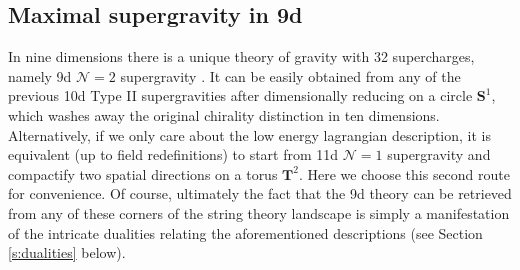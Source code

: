 \subsection{Maximal supergravity in 9d}\label{ss:9dmaxsugra}

In nine dimensions there is a unique theory of gravity with 32 supercharges, namely 9d $\mathcal{N}=2$ supergravity \cite{Gates:1984kr}. It can be easily obtained from any of the previous 10d Type II supergravities after dimensionally reducing on a circle $\mathbf{S}^1$, which washes away the original chirality distinction in ten dimensions. Alternatively, if we only care about the low energy lagrangian description, it is equivalent (up to field redefinitions) to start from 11d $\mathcal{N}=1$ supergravity and compactify two spatial directions on a torus $\mathbf{T}^2$. Here we choose this second route for convenience. Of course, ultimately the fact that the 9d theory can be retrieved from any of these corners of the string theory landscape is simply a manifestation of the intricate dualities relating the aforementioned descriptions (see Section \ref{s:dualities} below). 

